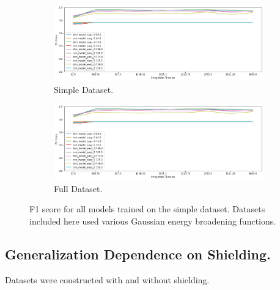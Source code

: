 \begin{figure}[H]
     \centering
     \begin{subfigure}[b]{0.9\textwidth}
         \centering
         \includegraphics[width=\textwidth]{images/results_easy_distance_comparison}
         \caption{Simple Dataset.}
         \label{fig:results_easy_distance_comparison_simple}
     \end{subfigure}

     \begin{subfigure}[b]{0.9\textwidth}
         \centering
         \includegraphics[width=\textwidth]{images/results_easy_distance_comparison}
         \caption{Full Dataset.}
         \label{fig:results_easy_distance_comparison_full}
     \end{subfigure}
        \caption{F1 score for all models trained on the simple dataset. Datasets included here used various Gaussian energy broadening functions.}
        \label{fig:results_easy_distance_comparison}
\end{figure}


\subsection{Generalization Dependence on Shielding.}

Datasets were constructed with and without shielding. 

